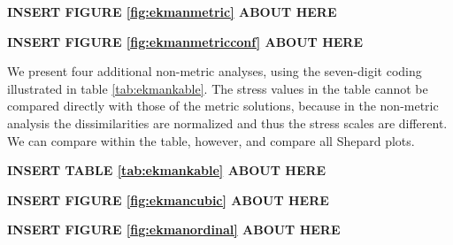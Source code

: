\documentclass[
  12pt,
]{article}
\begin{document}
\begin{greybox}

\begin{center}
\textbf{INSERT FIGURE \ref{fig:ekmanmetric} ABOUT HERE}

\end{center}

\end{greybox}

\begin{greybox}

\begin{center}
\textbf{INSERT FIGURE \ref{fig:ekmanmetricconf} ABOUT HERE}

\end{center}

\end{greybox}

We present four additional non-metric analyses, using the seven-digit coding
illustrated in table \ref{tab:ekmankable}. The stress values in the table cannot be compared directly with those of the metric solutions, because in the non-metric analysis the dissimilarities are normalized and thus the stress scales are different. We can compare within the table, however, and compare all Shepard plots.

\begin{greybox}

\begin{center}
\textbf{INSERT TABLE \ref{tab:ekmankable} ABOUT HERE}

\end{center}

\end{greybox}

\begin{greybox}

\begin{center}
\textbf{INSERT FIGURE \ref{fig:ekmancubic} ABOUT HERE}

\end{center}

\end{greybox}

\begin{greybox}

\begin{center}
\textbf{INSERT FIGURE \ref{fig:ekmanordinal} ABOUT HERE}

\end{center}

\end{greybox}
\end{document}
